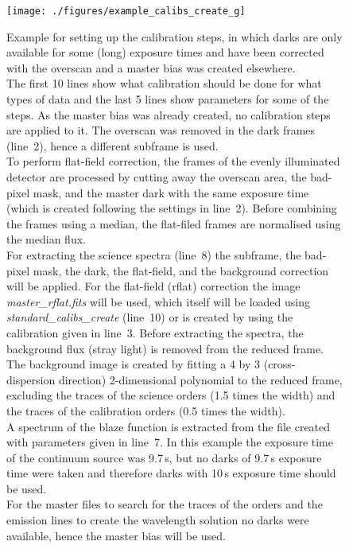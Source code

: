\documentclass[10pt,a4paper]{article}
\begin{document}
\begin{figure} 
  \begin{center}
    \texttt{[image: ./figures/example\_calibs\_create\_g]}
  \end{center}
  \caption{\small Example for setting up the calibration steps, in which darks are only available for some (long) exposure times and have been corrected with the overscan and a master bias was created elsewhere.\\
   The first 10 lines show what calibration should be done for what types of data and the last 5 lines show parameters for some of the steps. As the master bias was already created, no calibration steps are applied to it.
   The overscan was removed in the dark frames (line~2), hence a different subframe is used.\\
   To perform flat-field correction, the frames of the evenly illuminated detector are processed by cutting away the overscan area, the bad-pixel mask, and the master dark with the same exposure time (which is created following the settings in line~2). Before combining the frames using a median, the flat-filed frames are normalised using the median flux.\\
    For extracting the science spectra (line~8) the subframe, the bad-pixel mask, the dark, the flat-field, and the background correction will be applied. For the flat-field (rflat) correction the image \textit{master\_rflat.fits} will be used, which itself will be loaded using \textit{standard\_calibs\_create} (line~10) or is created by using the calibration given in line~3. Before extracting the spectra, the background flux (stray light) is removed from the reduced frame. The background image is created by fitting a 4 by 3 (cross-dispersion direction) 2-dimensional polynomial to the reduced frame, excluding the traces of the science orders (1.5 times the width) and the traces of the calibration orders (0.5 times the width).\\
    A spectrum of the blaze function is extracted from the file created with parameters given in line~7. In this example the exposure time of the continuum source was 9.7\,s, but no darks of 9.7\,s exposure time were taken and therefore darks with 10\,s exposure time should be used.\\
    For the master files to search for the traces of the orders and the emission lines to create the wavelength solution no darks were available, hence the master bias will be used.
    \label{Fig:example_calibs_create_g}}
\end{figure}
\end{document}
